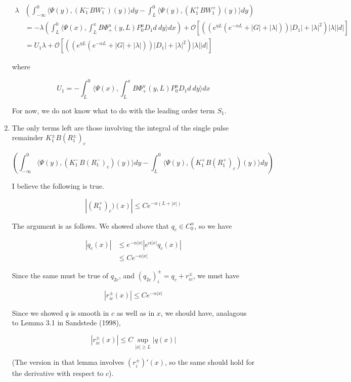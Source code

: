 \documentclass[12pt]{article}
\begin{document}
\begin{enumerate}
\begin{align*}
\lambda&\left( \int_{-\infty}^0 \langle \Psi(y), (K_1^- B W_1^-)(y) \rangle dy - \int_{L}^0 \langle \Psi(y), (K_1^+ B W_1^+)(y) \rangle dy \right) \\
&= -\lambda \left( \int_{L}^0 \langle \Psi(x), \int_{L}^x B\Phi^u_+(y, L) P_0^u D_1 d \:dy \rangle dx \right) + \mathcal{O} \left[ \left(\left( e^{\eta L}(e^{-\alpha L} + |G| + |\lambda|) \right)|D_1| + |\lambda|^2 \right)|\lambda| |d|\right] \\
&= U_1 \lambda + \mathcal{O} \left[ \left(\left( e^{\eta L}(e^{-\alpha L} + |G| + |\lambda|) \right)|D_1| + |\lambda|^2 \right)|\lambda| |d|\right]
\end{align*}

where

\[
U_1 = -\int_{L}^0 \langle \Psi(x), \int_{L}^x B\Phi^u_+(y, L) P_0^u D_1 d\:dy \rangle dx 
\]

For now, we do not know what to do with the leading order term $S_1$.

\item The only terms left are those involving the integral of the single pulse remainder $K_1^\pm B (R_1^\pm)_c$

\[
\left( \int_{-\infty}^0 \langle \Psi(y), (K_1^- B (R_1^-)_c)(y) \rangle dy - \int_{L}^0 \langle \Psi(y), (K_1^+ B (R_1^+)_c)(y) \rangle dy \right) 
\]

I believe the following is true.

\[
|(R_1^+)_c)(x)| \leq Ce^{-\alpha(L + |x|)}
\]

The argument is as follows. We showed above that $q_c \in C_0^\alpha$, so we have

\begin{align*}
|q_c(x)| &\leq e^{-\alpha |x|} | e^{\alpha |x|} q_c(x) | \\
&\leq C e^{-\alpha |x|} 
\end{align*} 

Since the same must be true of $q_{2c}$, and $(q_{2c})_i^\pm = q_c + r_{ic}^\pm$, we must have

\[
|r_{ic}^\pm(x)| \leq C e^{-\alpha |x|} 
\] 

Since we showed $q$ is smooth in $c$ as well as in $x$, we should have, analagous to Lemma 3.1 in Sandstede (1998),

\[
|r_{ic}^\pm(x)| \leq C \sup_{|x| \geq L} |q(x)|
\]

(The version in that lemma involves $(r_i^\pm)'(x)$, so the same should hold for the derivative with respect to $c$). \\


\end{enumerate}
\end{document}
